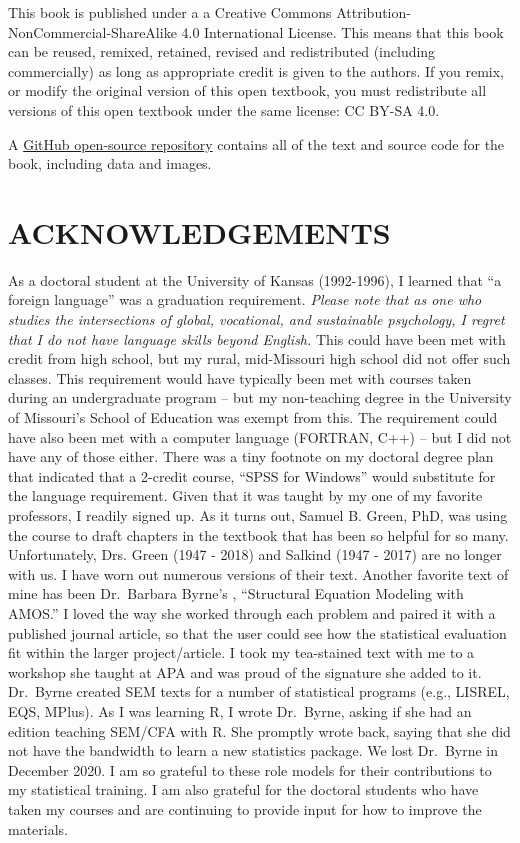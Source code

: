 \documentclass[
  11pt,
]{book}
\begin{document}
This book is published under a a Creative Commons Attribution-NonCommercial-ShareAlike 4.0 International License. This means that this book can be reused, remixed, retained, revised and redistributed (including commercially) as long as appropriate credit is given to the authors. If you remix, or modify the original version of this open textbook, you must redistribute all versions of this open textbook under the same license: CC BY-SA 4.0.

A \href{https://github.com/lhbikos/ReCenterPsychStats}{GitHub open-source repository} contains all of the text and source code for the book, including data and images.

\hypertarget{acknowledgements}{%
\chapter*{ACKNOWLEDGEMENTS}\label{acknowledgements}}

As a doctoral student at the University of Kansas (1992-1996), I learned that ``a foreign language'' was a graduation requirement. \emph{Please note that as one who studies the intersections of global, vocational, and sustainable psychology, I regret that I do not have language skills beyond English.} This could have been met with credit from high school, but my rural, mid-Missouri high school did not offer such classes. This requirement would have typically been met with courses taken during an undergraduate program -- but my non-teaching degree in the University of Missouri's School of Education was exempt from this. The requirement could have also been met with a computer language (FORTRAN, C++) -- but I did not have any of those either. There was a tiny footnote on my doctoral degree plan that indicated that a 2-credit course, ``SPSS for Windows'' would substitute for the language requirement. Given that it was taught by my one of my favorite professors, I readily signed up. As it turns out, Samuel B. Green, PhD, was using the course to draft chapters in the textbook \citep{green_using_2014} that has been so helpful for so many. Unfortunately, Drs. Green (1947 - 2018) and Salkind (1947 - 2017) are no longer with us. I have worn out numerous versions of their text. Another favorite text of mine has been Dr.~Barbara Byrne's \citeyearpar{byrne_structural_2016}, ``Structural Equation Modeling with AMOS.'' I loved the way she worked through each problem and paired it with a published journal article, so that the user could see how the statistical evaluation fit within the larger project/article. I took my tea-stained text with me to a workshop she taught at APA and was proud of the signature she added to it. Dr.~Byrne created SEM texts for a number of statistical programs (e.g., LISREL, EQS, MPlus). As I was learning R, I wrote Dr.~Byrne, asking if she had an edition teaching SEM/CFA with R. She promptly wrote back, saying that she did not have the bandwidth to learn a new statistics package. We lost Dr.~Byrne in December 2020. I am so grateful to these role models for their contributions to my statistical training. I am also grateful for the doctoral students who have taken my courses and are continuing to provide input for how to improve the materials.
\end{document}
